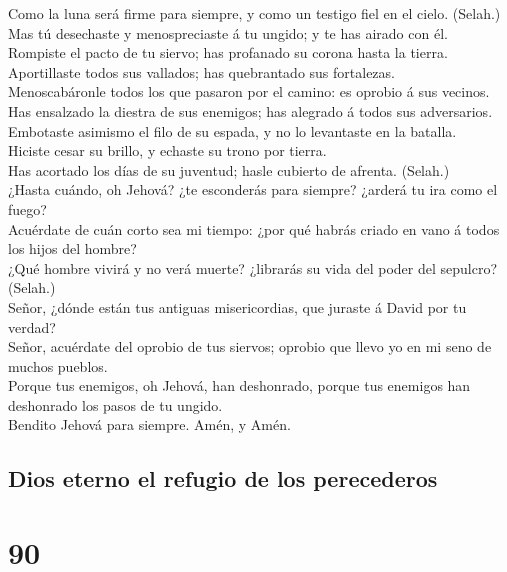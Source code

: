  Como la luna será firme para siempre, y como un testigo
fiel en el cielo. (Selah.)\\
 Mas tú desechaste y menospreciaste á tu ungido; y te has
airado con él.\\
 Rompiste el pacto de tu siervo; has profanado su corona
hasta la tierra.\\
 Aportillaste todos sus vallados; has quebrantado sus
fortalezas.\\
 Menoscabáronle todos los que pasaron por el camino: es
oprobio á sus vecinos.\\
 Has ensalzado la diestra de sus enemigos; has alegrado á
todos sus adversarios.\\
 Embotaste asimismo el filo de su espada, y no lo
levantaste en la batalla.\\
 Hiciste cesar su brillo, y echaste su trono por tierra.\\
 Has acortado los días de su juventud; hasle cubierto de
afrenta. (Selah.)\\
 ¿Hasta cuándo, oh Jehová? ¿te esconderás para siempre?
¿arderá tu ira como el fuego?\\
 Acuérdate de cuán corto sea mi tiempo: ¿por qué habrás
criado en vano á todos los hijos del hombre?\\
 ¿Qué hombre vivirá y no verá muerte? ¿librarás su vida del
poder del sepulcro? (Selah.)\\
 Señor, ¿dónde están tus antiguas misericordias, que
juraste á David por tu verdad?\\
 Señor, acuérdate del oprobio de tus siervos; oprobio que
llevo yo en mi seno de muchos pueblos.\\
 Porque tus enemigos, oh Jehová, han deshonrado, porque tus
enemigos han deshonrado los pasos de tu ungido.\\
 Bendito Jehová para siempre. Amén, y Amén.

\hypertarget{dios-eterno-el-refugio-de-los-perecederos}{%
\subsection{Dios eterno el refugio de los
perecederos}\label{dios-eterno-el-refugio-de-los-perecederos}}

\hypertarget{section-89}{%
\section{90}\label{section-89}}

